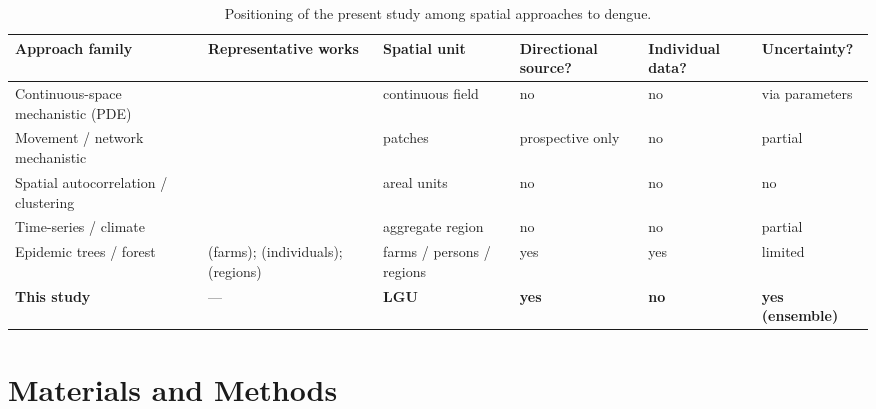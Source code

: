 \documentclass[a4paper,11pt]{article}
\begin{document}
\begin{table}[htbp]
\centering
\caption{Positioning of the present study among spatial approaches to dengue.}
\label{tab:positioning}
\footnotesize
\setlength{\tabcolsep}{4pt}
\begin{tabular}{p{2.5cm}p{2.4cm}p{1.7cm}>{\centering\arraybackslash}p{1.8cm}>{\centering\arraybackslash}p{1.7cm}>{\centering\arraybackslash}p{2.0cm}}
\toprule
\textbf{Approach family} & \textbf{Representative works} & \textbf{Spatial unit} &
\textbf{Directional source?} & \textbf{Individual data?} &
\textbf{Uncertainty?} \\
\midrule
Continuous-space mechanistic (PDE) & \cite{Maidana2007,Aguiar2022,Triska2022} & continuous field & no & no & via parameters \\
Movement / network mechanistic & \cite{Lezama2018,Lourenco2013} & patches & prospective only & no & partial \\
Spatial autocorrelation / clustering & \cite{Nakhapakorn2006} & areal units & no & no & no \\
Time-series / climate & \cite{Morales2019,Polwiang2020} & aggregate region & no & no & partial \\
Epidemic trees / forest & \cite{Haydon2003} (farms); \cite{Li2019} (individuals); \cite{Nasution2024} (regions) & farms / persons / regions & yes & \cite{Li2019} yes & limited \\
\textbf{This study} & --- & \textbf{LGU} & \textbf{yes} & \textbf{no} & \textbf{yes (ensemble)} \\
\bottomrule
\end{tabular}
\end{table}

\section{Materials and Methods}
\end{document}
